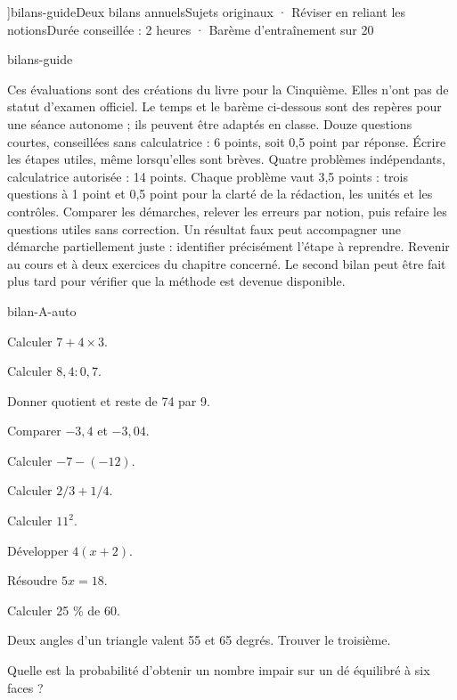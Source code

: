 \editionPage[\pdfbookmark[0]{Deux bilans annuels}{bm-bilans-guide-parent}]{bilans-guide}{Deux bilans annuels}{Sujets originaux · Réviser en reliant les notions}{Durée conseillée : 2 heures · Barème d’entraînement sur 20}
\begin{blocEdition}{bilans-guide}

Ces évaluations sont des créations du livre pour la Cinquième. Elles n’ont
pas de statut d’examen officiel. Le temps et le barème ci-dessous sont des
repères pour une séance autonome ; ils peuvent être adaptés en classe.
Douze questions courtes, conseillées sans calculatrice : 6 points, soit
0,5 point par réponse. Écrire les étapes utiles, même lorsqu’elles sont brèves.
Quatre problèmes indépendants, calculatrice autorisée : 14 points.
Chaque problème vaut 3,5 points : trois questions à 1 point et 0,5 point
pour la clarté de la rédaction, les unités et les contrôles.
Comparer les démarches, relever les erreurs par notion, puis refaire
les questions utiles sans correction. Un résultat faux peut accompagner
une démarche partiellement juste : identifier précisément l’étape à reprendre.
Revenir au cours et à deux exercices du chapitre concerné. Le second
bilan peut être fait plus tard pour vérifier que la méthode est devenue disponible.

\end{blocEdition}
\begin{blocEdition}{bilan-A-auto}
\begin{questions}
\item Calculer $7+4\times3$.
\item Calculer $8{,}4:0{,}7$.
\item Donner quotient et reste de 74 par 9.
\item Comparer $-3{,}4$ et $-3{,}04$.
\item Calculer $-7-(-12)$.
\item Calculer $2/3+1/4$.
\item Calculer $11^2$.
\item Développer $4(x+2)$.
\item Résoudre $5x=18$.
\item Calculer 25 \% de 60.
\item Deux angles d’un triangle valent 55 et 65 degrés. Trouver le troisième.
\item Quelle est la probabilité d’obtenir un nombre impair sur un dé équilibré à six faces ?\end{questions}
\end{blocEdition}
